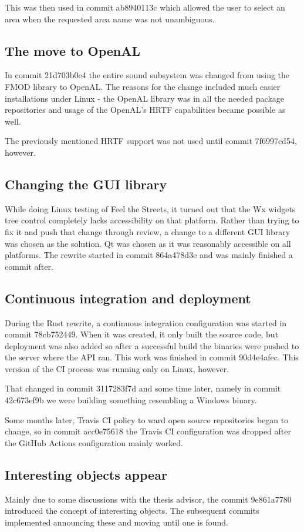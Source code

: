 \documentclass[nolof,digital]{fithesis3}
\begin{document}
This was then used in commit ab8940113c which allowed the user to select an area when the requested area name was not unambiguous.
\subsection{The move to OpenAL}
In commit 21d703b0e4 the entire sound subsystem was changed from using the FMOD library \parencite{fmod} to OpenAL. The reasons for the change included much easier installations under Linux - the OpenAL library was in all the needed package repositories and usage of the OpenAL's HRTF capabilities became possible as well.

The previously mentioned HRTF support was not used until commit 7f6997cd54, however.
\subsection{Changing the GUI library}
While doing Linux testing of Feel the Streets, it turned out that the Wx widgets tree control completely lacks accessibility on that platform. Rather than trying to fix it and push that change through review, a change to a different GUI library was chosen as the solution. Qt was chosen as it was reasonably accessible on all platforms. The rewrite started in commit 864a478d3e and was mainly finished a commit after.
\subsection{Continuous integration and deployment}
During the Rust rewrite, a continuous integration configuration was started in commit 78cb752449. When it was created, it only built the source code, but deployment was also added so after a successful build the binaries were pushed to the server where the API ran. This work was finished in commit 90d4e4afec. This version of the CI process was running only on Linux, however.

That changed in commit 3117283f7d and some time later, namely in commit 42c673ef9b we were building something resembling a Windows binary.

Some months later, Travis CI policy to ward open source repositories began to change, so in commit acc0e75618 the Travis CI configuration was dropped after the GitHub Actions configuration mainly worked.
\subsection{Interesting objects appear}
Mainly due to some discussions with the thesis advisor, the commit 9e861a7780 introduced the concept of interesting objects. The subsequent commits implemented announcing these and moving until one is found.
\end{document}
